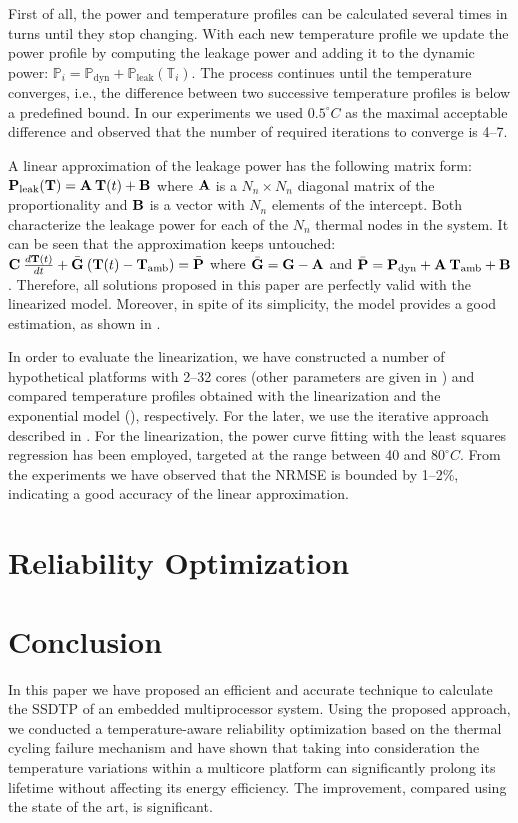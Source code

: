 First of all, the power and temperature profiles can be calculated several times
in turns until they stop changing. With each new temperature profile we update
the power profile by computing the leakage power and adding it to the dynamic
power: $\mathbb{P}_i = \mathbb{P}_\text{dyn} +
\mathbb{P}_\text{leak}(\mathbb{T}_i)$. The process continues until the
temperature converges, i.e., the difference between two successive temperature
profiles is below a predefined bound. In our experiments we used $0.5^\circ C$
as the maximal acceptable difference and observed that the number of required
iterations to converge is 4--7.

A linear approximation of the leakage power has the following matrix form:
$\mathbf{P}_\text{leak}(\mathbf{T}) = \mathbf{A} \: \mathbf{T}(t) + \mathbf{B}$ where $\mathbf{A}$ is a $N_n
\times N_n$ diagonal matrix of the proportionality and $\mathbf{B}$ is a vector with
$N_n$ elements of the intercept. Both characterize the leakage power for each of
the $N_n$ thermal nodes in the system. It can be seen that the approximation
keeps  untouched: $\mathbf{C} \:
\frac{d\mathbf{T}(t)}{dt} + \bar{\mathbf{G}} \: (\mathbf{T}(t) - \mathbf{T}_{\mathrm{amb}}) = \bar{\mathbf{P}}$
where $\bar{\mathbf{G}} = \mathbf{G} - \mathbf{A}$ and $\bar{\mathbf{P}} = \mathbf{P}_\text{dyn} + \mathbf{A}
\: \mathbf{T}_{\mathrm{amb}} + \mathbf{B}$. Therefore, all solutions proposed in this paper are
perfectly valid with the linearized model. Moreover, in spite of its simplicity,
the model provides a good estimation, as shown in \cite{liu2007}.

In order to evaluate the linearization, we have constructed a number of
hypothetical platforms with 2--32 cores (other parameters are given in
) and compared temperature profiles obtained with the
linearization and the exponential model (), respectively. For
the later, we use the iterative approach described in
. For the linearization, the power curve
fitting with the least squares regression \cite{press2007} has been employed,
targeted at the range between 40 and $80^\circ C$. From the experiments we have
observed that the NRMSE is bounded by 1--2\%, indicating a good accuracy of the
linear approximation.

\section{Reliability Optimization}


\section{Conclusion}

In this paper we have proposed an efficient and accurate technique to calculate
the SSDTP of an embedded multiprocessor system. Using the proposed approach, we
conducted a temperature-aware reliability optimization based on the thermal
cycling failure mechanism and have shown that taking into consideration the
temperature variations within a multicore platform can significantly prolong its
lifetime without affecting its energy efficiency. The improvement, compared
using the state of the art, is significant.
